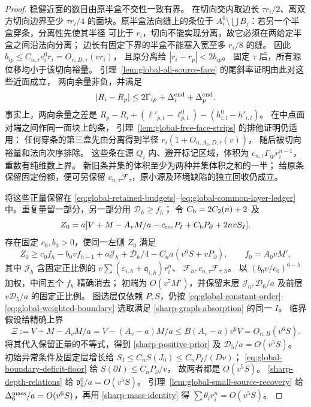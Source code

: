 \begin{proof}
稳健近面的数目由原半盒不交性一致有界。
在切向交内取边长 \(\tau r_i/2\)、离双方切向边界至少
\(\tau r_i/4\) 的面块。原半盒法向缝上的条位于
\(A_i^0\setminus\bigcup B_j\)：若另一个半盒穿条，分离性先使其半径
可比于 \(r_i\)，切向不能实现分离，故它必须在两给定半盒之间沿法向分离；
边长有固定下界的半盒不能塞入宽至多 \(r_i/8\) 的缝。
因此 \(b_{ip}\le C_{n,\tau}e_i^0r_i=O_{n,D,\tau}(vr_i)\)，
且原分离给 \(|r_i-r_p|<2b_{ip}\)。
固定 \(\tau\) 后，所有源位移均小于该切向裕量。
引理~\ref{lem:global-all-source-face} 的尾斜率证明由此对这些近面成立，
两向余量非负，并满足
\begin{equation}\label{sharp-root-jump}
 |R_i-R_p|\le2\Gamma_{ip}
             +\Delta_i^{\rm end}+\Delta_p^{\rm end}.
\end{equation}
事实上，两向余量之差是
\(R_p-R_i+(\ell'_{p,l}-\ell^0_{p,l})-(h^0_{i,l}-h'_{i,l})\)。
在中点面对端之间作同一面块上的条，
引理~\ref{lem:global-free-face-strips} 的排他证明仍适用：
任何穿条的第三盒先由分离得到半径 \(r_i(1+O_{n,A_6,D,\tau}(v))\)，
随后被切向裕量和法向次序排除。
这些条在源 \(Q_i\) 内、避开标记区域，体积为
\(c_{n,\tau}\Gamma_{ip}r_i^{n-1}\)，重数有纯维数上界。
新旧条并集的体积至少为两种并集体积之和的一半；
给原条保留固定份额，便可另保留
\(c_{n,\tau}\mathcal F_\tau\)，原小源及环境缺陷的独立回收仍成立。

将这些正量保留在
\eqref{eq:global-retained-budgets}--\eqref{eq:global-common-layer-ledger}
中。重复量留一部分，另一部分用 \(\mathcal D_h\ge f_h\)；
令 \(C_{\rm b}=2C_2(n)+2\) 及
\[
 Z_0=a[V+M-A_vM/a-c_{\rm rec}P_I+C_{\rm b}P_\partial+2nvS_I].
\]
存在固定 \(c_0,b_0>0\)，使同一左侧 \(Z_0\) 满足
\begin{equation}\label{sharp-coarse-retained-recursion}
 Z_0\ge c_0f_h-b_0vf_{h-1}
       +a\mathcal J_h+\mathcal D_h/4
       -C_na(v^6S+vP_\partial),\qquad
 f_0=A_0vM',
\end{equation}
其中 \(\mathcal J_h\) 含固定正比例的
\(v\sum(\varepsilon_{i,h}+\mathfrak q_{i,h})r_i^n\)、
\(\mathcal F_h,c_{n,\tau}\mathcal F_{\tau,h}\)。
以 \((b_0v/c_0)^{6-h}\) 加权，中间五个 \(f_h\) 精确消去；
初端为 \(O(v^7M')\)，并保留末层 \(\mathcal J_6,\mathcal D_6/a\)
及前层 \(v\mathcal D_5/a\) 的固定正比例。
图选层仅依赖 \(P,S\)，仍按
\eqref{eq:global-constant-order}--\eqref{eq:global-weighted-boundary}
选取满足 \eqref{sharp-graph-absorption} 的同一 \(I\)。
临界假设给精确上界
\[
 \Xi:=V+M-A_vM/a
 =V-(A_v-a)M/a
 \le B(A_v-a)v^6V=O_{n,B}(v^6S).
\]
将其代入保留正量的不等式，得到
\eqref{sharp-positive-prior} 及 \(\mathcal D_5/a=O(v^5S)\)。
初始异常条件及固定层增长给
\(S_I\le C_nS(J_0)\le C_nP_I/(Dv)\)；
\eqref{eq:global-boundary-deficit-floor} 给
\(S(\partial I)\le C_nP_\partial/v\)，
故两者都是 \(O(v^5S)\)。
\eqref{sharp-depth-relations} 给 \(\mathfrak d_6^0/a=O(v^5S)\)。
引理~\ref{lem:global-small-source-recovery} 给
\(\Delta_6^{\rm mass}/a=O(v^6S)\)，再用
\eqref{sharp-mass-identity} 得 \(\sum\theta_i r_i^n=O(v^5S)\)。


\end{proof}
